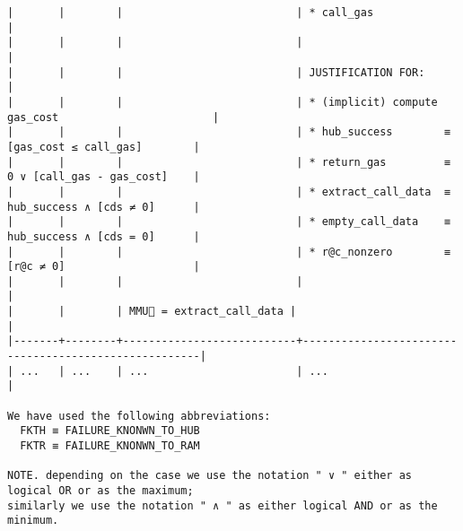 \documentclass[varwidth=\maxdimen,margin=0.5cm,multi={verbatim}]{standalone}
\begin{document}
\begin{verbatim}
|       |        |                           | * call_gas                                           |
|       |        |                           |                                                      |
|       |        |                           | JUSTIFICATION FOR:                                   |
|       |        |                           | * (implicit) compute gas_cost                        |
|       |        |                           | * hub_success        ≡  [gas_cost ≤ call_gas]        |
|       |        |                           | * return_gas         ≡  0 ∨ [call_gas - gas_cost]    |
|       |        |                           | * extract_call_data  ≡  hub_success ∧ [cds ≠ 0]      |
|       |        |                           | * empty_call_data    ≡  hub_success ∧ [cds = 0]      |
|       |        |                           | * r@c_nonzero        ≡  [r@c ≠ 0]                    |
|       |        |                           |                                                      |
|       |        | MMU🏴 = extract_call_data |                                                      |
|-------+--------+---------------------------+------------------------------------------------------|
| ...   | ...    | ...                       | ...                                                  |

We have used the following abbreviations:
  FKTH ≡ FAILURE_KNONWN_TO_HUB
  FKTR ≡ FAILURE_KNONWN_TO_RAM

NOTE. depending on the case we use the notation " ∨ " either as logical OR or as the maximum;
similarly we use the notation " ∧ " as either logical AND or as the minimum.
\end{verbatim}
\end{document}
